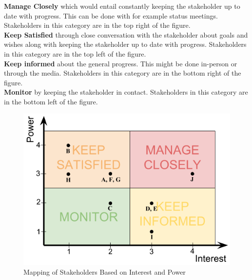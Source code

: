 \indent \textbf{Manage Closely} which would entail constantly keeping the stakeholder up to date with progress. This can be done with for example status meetings. Stakeholders in this category are in the top right of the figure.\\
\indent \textbf{Keep Satisfied} through close conversation with the stakeholder about goals and wishes along with keeping the stakeholder up to date with progress. Stakeholders in this category are in the top left of the figure.\\
\indent \textbf{Keep informed} about the general progress. This might be done in-person or through the media. Stakeholders in this category are in the bottom right of the figure.\\
\indent \textbf{Monitor} by keeping the stakeholder in contact. Stakeholders in this category are in the bottom left of the figure.


\begin{figure}[h]
    \centering
    \includegraphics[scale=0.5]{MarketStakeholderAnalysis/Figures/Stakeholder_mapping}
    \caption{Mapping of Stakeholders Based on Interest and Power}
    \label{fig:stake_map}
\end{figure}